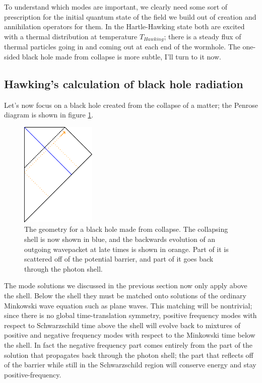 \documentclass[12pt]{article}
\begin{document}
To understand which modes are important, we clearly need some sort of prescription for the initial quantum state of the field we build out of creation and annihilation operators for them.  In the Hartle-Hawking state both are excited with a thermal distribution at temperature $T_{Hawking}$; there is a steady flux of thermal particles going in and coming out at each end of the wormhole.  The one-sided black hole made from collapse is more subtle, I'll turn to it now.


\subsection{Hawking's calculation of black hole radiation}\label{hawkrad}
Let's now focus on a black hole created from the collapse of a matter; the Penrose diagram is shown in figure \ref{collapse2}.
\begin{figure}
\begin{center}
\includegraphics[height=5cm]{collapse2.pdf}
\caption{The geometry for a black hole made from collapse.  The collapsing shell is now shown in blue, and the backwards evolution of an outgoing wavepacket at late times is shown in orange.  Part of it is scattered off of the potential barrier, and part of it goes back through the photon shell.}\label{collapse2}
\end{center}
\end{figure}
 
The mode solutions we discussed in the previous section now only apply above the shell.  Below the shell they must be matched onto solutions of the ordinary Minkowski wave equation such as plane waves.  This matching will be nontrivial;  since there is no global time-translation symmetry, positive frequency modes with respect to Schwarzschild time above the shell will evolve back to mixtures of positive and negative frequency modes with respect to the Minkowski time below the shell.  In fact the negative frequency part comes entirely from the part of the solution that propagates back through the photon shell; the part that reflects off of the barrier while still in the Schwarzschild region will conserve energy and stay positive-frequency.  
\end{document}

